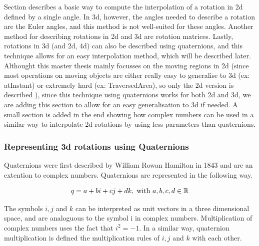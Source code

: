 	
	Section  describes a basic way to compute the interpolation of a rotation in 2d defined by a single angle. In 3d, however, the angles needed to describe a rotation are the Euler angles, and this method is not well-suited for these angles.  Another method for describing rotations in 2d and 3d are rotation matrices.  Lastly, rotations in 3d (and 2d, 4d) can also be described using quaternions, and this technique allows for an easy interpolation method, which will be described later. Althought this master thesis mainly focusses on the moving regions in 2d (since most operations on moving objects are either really easy to generalise to 3d (ex: atInstant) or extremely hard (ex: TraversedArea), so only the 2d version is described ), since this technique using quaternions works for both 2d and 3d, we are adding this section to allow for an easy generalisation to 3d if needed. A small section is added in the end showing how complex numbers can be used in a similar way to interpolate 2d rotations by using less parameters than quaternions.
	
		\subsubsection{Representing 3d rotations using Quaternions}
		
		Quaternions were first described by William Rowan Hamilton in 1843  and are an extention to complex numbers. Quaternions are represented in the following way.
		
		\begin{equation}
			q = a + bi + cj + dk, \; \text{with } a, b, c, d \in \mathbb{R} \\
		\end{equation}
		
		The symbols \( i, j \) and \( k \) can be interpreted as unit vectors in a three dimensional space, and are analoguous to the symbol i in complex numbers. Multiplication of complex numbers uses the fact that \( i^2 = -1 \). In a similar way, quaternion multiplication is defined the multiplication rules of \( i, j \) and \( k \) with each other.
		
